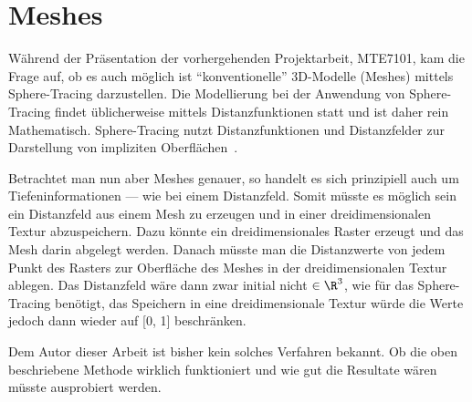 
\section{Meshes}
\label{sec:rendering:meshes}

Während der Präsentation der vorhergehenden Projektarbeit, MTE7101, kam die
Frage auf, ob es auch möglich ist ``konventionelle'' 3D-Modelle (Meshes) mittels
Sphere-Tracing darzustellen. Die Modellierung bei der Anwendung von Sphere-Tracing findet 
üblicherweise mittels Distanzfunktionen statt und ist daher rein Mathematisch.
Sphere-Tracing nutzt Distanzfunktionen und Distanzfelder zur Darstellung von
impliziten Oberflächen~\cite[S. 31]{osterwalder_sven_volume_2016}.

Betrachtet man nun aber Meshes genauer, so handelt es sich prinzipiell auch um
Tiefeninformationen --- wie bei einem Distanzfeld. Somit müsste es möglich sein
ein Distanzfeld aus einem Mesh zu erzeugen und in einer dreidimensionalen
Textur abzuspeichern. Dazu könnte ein dreidimensionales Raster erzeugt und das
Mesh darin abgelegt werden. Danach müsste man die Distanzwerte von jedem Punkt
des Rasters zur Oberfläche des Meshes in der dreidimensionalen Textur ablegen.
Das Distanzfeld wäre dann zwar initial nicht $\in \R^{3}$, wie für das
Sphere-Tracing benötigt, das Speichern in eine dreidimensionale Textur würde
die Werte jedoch dann wieder auf [0, 1] beschränken.

Dem Autor dieser Arbeit ist bisher kein solches Verfahren bekannt. Ob die oben
beschriebene Methode wirklich funktioniert und wie gut die Resultate wären
müsste ausprobiert werden.

